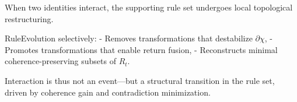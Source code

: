 When two identities interact, the supporting rule set undergoes local topological restructuring.

RuleEvolution selectively:
- Removes transformations that destabilize $\partial\chi$,
- Promotes transformations that enable return fusion,
- Reconstructs minimal coherence-preserving subsets of $R_t$.

Interaction is thus not an event—but a structural transition in the rule set, driven by coherence gain and contradiction minimization.

